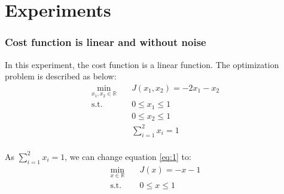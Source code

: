 \documentclass[a4paper,12pt]{article}
\begin{document}


\part{Experiments}
\section{Cost function is linear and without noise}
In this experiment, the cost function is a linear function. The optimization problem is described as below:\\


\begin{equation}\label{eq:1}
\begin{aligned}
\min_{x_1,x_2\in \mathbb{R}} \quad & J(x_1,x_2) = -2x_1-x_2\\
\textrm{s.t.} \quad & 0 \leq x_1 \leq 1\\
              \quad & 0 \leq x_2 \leq 1\\
              \quad & \sum_{i=1}^{2} x_i = 1\\
\end{aligned}
\end{equation}


As $\sum_{i=1}^{2} x_i = 1$, we can change equation \ref{eq:1} to:\\
\begin{equation}\label{eq:2}
\begin{aligned}
\min_{x\in \mathbb{R}} \quad & J(x) = -x-1\\
\textrm{s.t.} \quad & 0 \leq x \leq 1\\
\end{aligned}
\end{equation}
\end{document}
